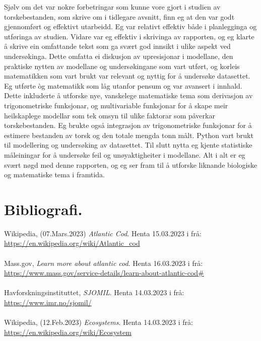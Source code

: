 \documentclass{report}
\begin{document}
Sjølv om det var nokre forbetringar som kunne vore gjort i studien av torskebestanden, som skrive om i tidlegare avsnitt, finn eg at den var godt gjennomført og effektivt utarbeidd. Eg var relativt effektiv både i planlegginga og utføringa av studien. Vidare var eg effektiv i skrivinga av rapporten, og eg klarte å skrive ein omfattande tekst som ga svært god innsikt i ulike aspekt ved undersøkinga. Dette omfatta ei diskusjon av upresisjonar i modellane, den praktiske nytten av modellane og undersøkingane som vart utført, og korleis matematikken som vart brukt var relevant og nyttig for å undersøke datasettet. Eg utførte òg matematikk som låg utanfor pensum og var avansert i innhald. Dette inkluderte å utforske nye, vanskelege matematiske tema som derivasjon av trigonometriske funksjonar, og multivariable funksjonar for å skape meir heilskaplege modellar som tek omsyn til ulike faktorar som påverkar torskebestanden. Eg brukte også integrasjon av trigonometriske funksjonar for å estimere bestanden av torsk og den totale mengda tonn målt. Python vart brukt til modellering og undersøking av datasettet. Til slutt nytta eg kjente statistiske måleiningar for å undersøke feil og unøyaktigheiter i modellane. Alt i alt er eg svært nøgd med denne rapporten, og eg ser fram til å utforske liknande biologiske og matematiske tema i framtida.
\chapter{Bibliografi.}
Wikipedia, (07.Mars.2023) \textit{Atlantic Cod}. Henta 15.03.2023 i frå: \\
\url{https://en.wikipedia.org/wiki/Atlantic_cod} \\ \\
Mass.gov, \textit{Learn more about atlantic cod}. Henta 16.03.2023 i frå: \\
\url{https://www.mass.gov/service-details/learn-about-atlantic-cod#} \\ \\
Havforskningsinstituttet, \textit{SJOMIL}. Henta 14.03.2023 i frå: \\
\url{https://www.imr.no/sjomil/} \\ \\
Wikipedia, (12.Feb.2023) \textit{Ecosystems}. Henta 14.03.2023 i frå: \\
\url{https://en.wikipedia.org/wiki/Ecosystem} \\ \\
\end{document}
